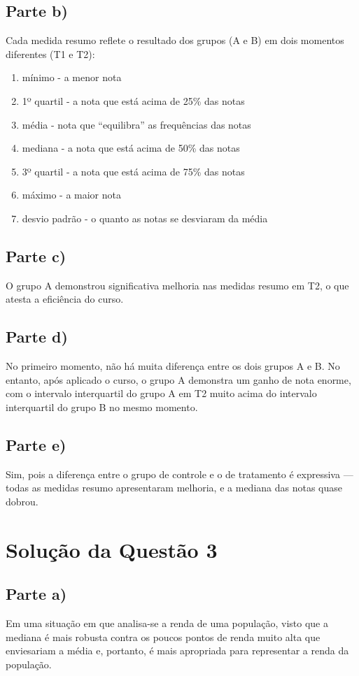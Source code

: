 \documentclass[
	12pt,				%
	openright,			%
	twoside,			%
	a4paper,			%
	english,			%
	french,				%
	spanish,			%
	brazil,				%
	]{abntex2}
\begin{document}
\subsection{Parte b)}
Cada medida resumo reflete o resultado dos grupos (A e B) em dois momentos diferentes (T1 e T2):
\begin{enumerate}[label=\Alph*)]
    \item mínimo - a menor nota 
    \item 1º quartil - a nota que está acima de 25\% das notas
    \item média - nota que ``equilibra'' as frequências das notas
    \item mediana - a nota que está acima de 50\% das notas
    \item 3º quartil - a nota que está acima de 75\% das notas
    \item máximo - a maior nota
    \item desvio padrão - o quanto as notas se desviaram da média
\end{enumerate}

\subsection{Parte c)}
O grupo A demonstrou significativa melhoria nas medidas resumo em T2, o que atesta a eficiência do curso.

\subsection{Parte d)}
No primeiro momento, não há muita diferença entre os dois grupos A e B. No entanto, após aplicado o curso, o grupo A demonstra um ganho de nota enorme, com o intervalo interquartil do grupo A em T2 muito acima do intervalo interquartil do grupo B no mesmo momento.

\subsection{Parte e)}
Sim, pois a diferença entre o grupo de controle e o de tratamento é expressiva --- todas as medidas resumo apresentaram melhoria, e a mediana das notas quase dobrou.

\section{Solução da Questão 3}
\subsection{Parte a)}
Em uma situação em que analisa-se a renda de uma população, visto que a mediana é mais robusta contra os poucos pontos de renda muito alta que enviesariam a média e, portanto, é mais apropriada para representar a renda da população.
\end{document}
